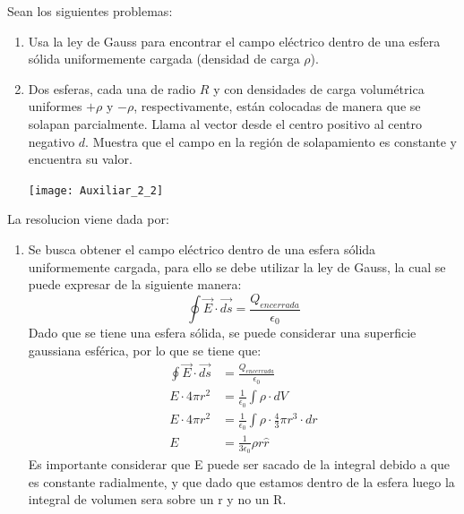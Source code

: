 \documentclass[
  11pt,
  letterpaper,
   addpoints,
   answers
  ]{exam}
\begin{document}
\begin{questions}
    \question Sean los siguientes problemas:
    \begin{enumerate}
        \item Usa la ley de Gauss para encontrar el campo eléctrico dentro de una esfera sólida uniformemente cargada (densidad de carga \( \rho \)).
        \item Dos esferas, cada una de radio \( R \) y con densidades de carga volumétrica uniformes \( +\rho \) y \( -\rho \), respectivamente, están colocadas de manera que se solapan parcialmente. Llama al vector desde el centro positivo al centro negativo \( d \). Muestra que el campo en la región de solapamiento es constante y encuentra su valor.
        \begin{center}
            \texttt{[image: Auxiliar\_2\_2]}
        \end{center}
    \end{enumerate}
    \begin{solution}
        La resolucion viene dada por:
        \begin{enumerate}
            \item Se busca obtener el campo eléctrico dentro de una esfera sólida uniformemente cargada, para ello se debe utilizar la ley de Gauss, la cual se puede expresar de la siguiente manera:
            \begin{equation}
                \oint \Vec{E} \cdot \Vec{ds} = \frac{Q_{encerrada}}{\epsilon_{0}}
            \end{equation}
            Dado que se tiene una esfera sólida, se puede considerar una superficie gaussiana esférica, por lo que se tiene que:
            \begin{align}
                \oint \Vec{E} \cdot \Vec{ds} &= \frac{Q_{encerrada}}{\epsilon_{0}}\\
                E \cdot 4\pi r^{2} &= \frac{1}{\epsilon_{0}} \int \rho \cdot dV\\
                E \cdot 4\pi r^{2} &= \frac{1}{\epsilon_{0}} \int \rho \cdot \frac{4}{3}\pi r^{3} \cdot dr\\
                E &= \frac{1}{3\epsilon_{0}} \rho r \hat{r}
            \end{align}
            Es importante considerar que E puede ser sacado de la integral debido a que es constante radialmente, y que dado que estamos dentro de la esfera luego la integral de volumen sera sobre un r y no un R.

\end{enumerate}
\end{solution}
\end{questions}
\end{document}
